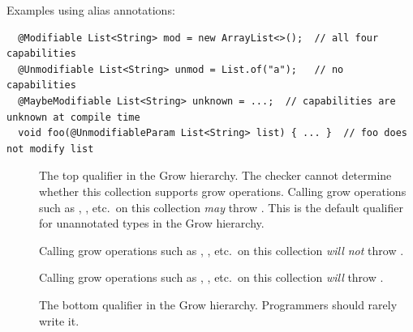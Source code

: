 \noindent
Examples using alias annotations:

\begin{Verbatim}
  @Modifiable List<String> mod = new ArrayList<>();  // all four capabilities
  @Unmodifiable List<String> unmod = List.of("a");   // no capabilities
  @MaybeModifiable List<String> unknown = ...;  // capabilities are unknown at compile time
  void foo(@UnmodifiableParam List<String> list) { ... }  // foo does not modify list
\end{Verbatim}



\begin{description}
\item[]
The top qualifier in the Grow hierarchy.
The checker cannot determine whether this collection supports grow
operations.
Calling grow operations such as , , etc.\ on this
collection \emph{may} throw \UnsupportedOperationException.
This is the default qualifier for unannotated types in the
Grow hierarchy.

\item[]
Calling grow operations such as , , etc.\ on this
collection \emph{will not} throw \UnsupportedOperationException.

\item[]
Calling grow operations such as , , etc.\ on this
collection \emph{will} throw \UnsupportedOperationException.

\item[]
The bottom qualifier in the Grow hierarchy.  Programmers should rarely write it.
\end{description}


